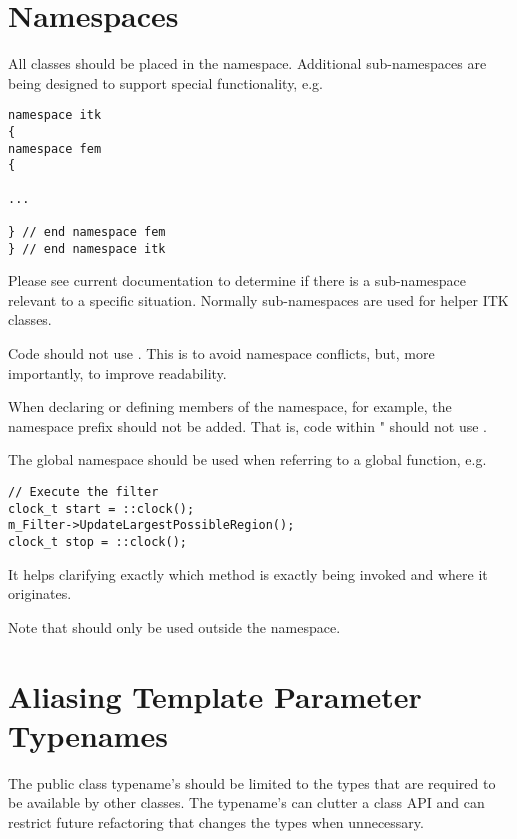 \section{Namespaces}
\label{sec:Namespaces}

All classes should be placed in the  namespace. Additional
sub-namespaces are being designed to support special functionality, e.g.

\small
\begin{verbatim}
namespace itk
{
namespace fem
{

...

} // end namespace fem
} // end namespace itk
\end{verbatim}
\normalsize

Please see current documentation to determine if there is a sub-namespace
relevant to a specific situation. Normally sub-namespaces are used for helper ITK
classes.

Code should not use . This is to avoid namespace
conflicts, but, more importantly, to improve readability.

When declaring or defining members of the  namespace, for example,
the  namespace prefix should not be added. That is, code within
" should not use .

The \code{::} global namespace should be used when referring to a global
function, e.g.

\small
\begin{verbatim}
// Execute the filter
clock_t start = ::clock();
m_Filter->UpdateLargestPossibleRegion();
clock_t stop = ::clock();
\end{verbatim}
\normalsize

It helps clarifying exactly which method is exactly being invoked and where it
originates.

Note that  should only be used outside the  namespace.


\section{Aliasing Template Parameter Typenames}
\label{sec:AliasingTemplateParameterTypenames}

The public class typename's should be limited to the types that are required to
be available by other classes. The typename's can clutter a class API and can
restrict future refactoring that changes the types when unnecessary.

